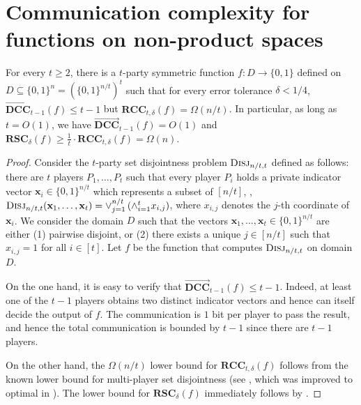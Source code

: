 \documentclass{toc}
\newcommand{\zo}{\ensuremath{ \{ 0, 1 \} }}
\newcommand{\zon}{\ensuremath{ \{ 0, 1 \}^n }}
\newcommand{\error}{\ensuremath{\delta}}
\newcommand{\bigo}[1]{\ensuremath{{{O} \left( {#1} \right)}}}
\newcommand{\bigomega}[1]{\ensuremath{{\Omega \left( {#1} \right)}}}
\newcommand{\rcc}{\ensuremath{\mathbf{RCC}}}
\newcommand{\rsc}{\ensuremath{\mathbf{RSC}}}
\newcommand{\dccone}{\ensuremath{\overrightarrow{\mathbf{DCC}}}}
\begin{document}
\section{Communication complexity for functions on non-product spaces}

\begin{theorem}\label{theorem:1-n-separation}
For every $t\ge 2$, there is a $t$-party symmetric function 
$f: D  \to \zo$ 
defined on $D\subseteq \zon= \left(\zo^{n/t} \right)^t$ 
such that for every error tolerance $\error<1/4$, 
$\dccone_{t-1}(f)\le t-1$ but $\rcc_{t,\error}(f)=  \bigomega{ n/t }$. 
In particular, 
as long as $t=\bigo{1}$, we have $\dccone_{t-1}(f) =\bigo{1}$ and $\rsc_\error(f) \ge {\frac{1}{t}\cdot\rcc_{t,\error}(f)} = \bigomega{n}$.
\end{theorem}


\begin{proof}
Consider the $t$-party set disjointness problem $\textsc{Disj}_{n/t,t}$ defined as follows:
there are $t$ players $P_1,\dots, P_t$ such that every player $P_i$ holds a private indicator vector $\mathbf{x}_i\in \zo^{n/t}$ which represents a subset of $[n/t]$, 
\ie,~$\textsc{Disj}_{n/t,t}(\mathbf{x}_1,\dots, \mathbf{x}_t)=\vee_{j=1}^{n/t} \left(\wedge_{i=1}^t x_{i,j}\right)$, where $x_{i,j}$ denotes the $j$-th coordinate of $\mathbf{x}_i$.
We consider the domain $D$ such that the vectors $\mathbf{x}_1,\dots, \mathbf{x}_t\in\zo^{n/t}$ are either
(1) pairwise disjoint, or (2) {\color{black} there exists a unique $j \in [n/t]$ such that $x_{i,j} = 1$ for all $i \in [t]$.}
%
Let $f$ be the function that computes $\textsc{Disj}_{n/t,t}$ on domain $D$.

On the one hand, it is easy to verify that $\dccone_{t-1}(f)\le t-1$. 
Indeed, at least one of the $t-1$ players obtains two distinct indicator vectors and hence can itself decide the output of $f$. 
The communication is $1$ bit per player to pass the result, and hence the total communication is bounded by $t-1$ since there are $t-1$ players.


On the other hand, the $\Omega(n/t)$ lower bound for $\rcc_{t,\error}(f)$ follows from the known lower bound for multi-player set disjointness 
(see \cite{BarYossef:2004eya}, which was improved to optimal in \cite{g09,jayram2009hellinger}). 
The lower bound for $\rsc_\error(f)$ immediately follows by .
\end{proof}
\end{document}
